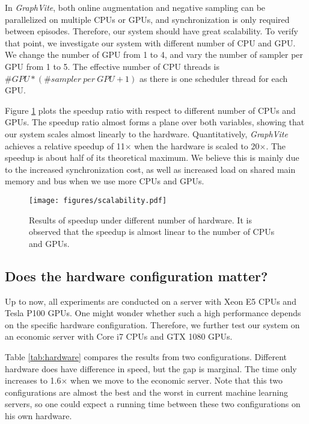 \documentclass[sigconf]{acmart}
\newcommand{\Graphy}{\textit{GraphVite}\xspace}
\begin{document}
In \Graphy, both online augmentation and negative sampling can be parallelized on multiple CPUs or GPUs, and synchronization is only required between episodes. Therefore, our system should have great scalability. To verify that point, we investigate our system with different 
number of CPU and GPU. We change the number of GPU from 1 to 4, and vary the number of sampler per GPU from 1 to 5. The effective number of CPU threads is $\#GPU * (\#sampler~per~GPU + 1)$ as there is one scheduler thread for each GPU.

Figure \ref{fig:scalability} plots the speedup ratio with respect to different number of CPUs and GPUs. The speedup ratio almost forms a plane over both variables, showing that our system scales almost linearly to the hardware. Quantitatively, \Graphy achieves a relative speedup of 11$\times$ when the hardware is scaled to 20$\times$. The speedup is about half of its theoretical maximum. We believe this is mainly due to the increased synchronization cost, as well as increased load on shared main memory and bus when we use more CPUs and GPUs.

\begin{figure}[!h]
    \centering
    \texttt{[image: figures/scalability.pdf]}
    \caption{Results of speedup under different number of hardware. It is observed that the speedup is almost linear to the number of CPUs and GPUs.}
    \label{fig:scalability}
\end{figure}

\subsection{Does the hardware configuration matter?}

Up to now, all experiments are conducted on a server with Xeon E5 CPUs and Tesla P100 GPUs. One might wonder whether such a high performance depends on the specific hardware configuration. Therefore, we further test our system on an economic server with Core i7 CPUs and GTX 1080 GPUs.

Table \ref{tab:hardware} compares the results from two configurations. Different hardware does have difference in speed, but the gap is marginal. The time only increases to 1.6$\times$ when we move to the economic server. Note that this two configurations are almost the best and the worst in current machine learning servers, so one could expect a running time between these two configurations on his own hardware.
\end{document}
